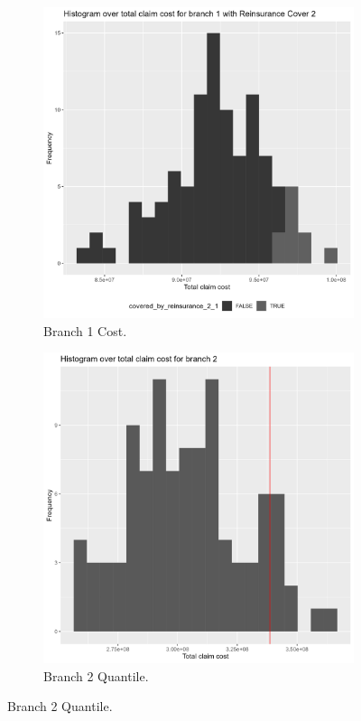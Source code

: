 \documentclass[11pt]{article}
\begin{document}
\begin{figure}[!h]
\begin{subfigure}{.24\textwidth}
      \includegraphics[width=.9\linewidth]{plots/reinsurance2/histogram_total_claim_cost_reinsurance2_1.png}
      \caption{Branch 1 Cost.}
    \end{subfigure}
    \begin{subfigure}{.24\textwidth}
      \centering
      \includegraphics[width=.9\linewidth]{plots/reinsurance2/histogram_over_90p_quantile_2.png}
      \caption{Branch 2 Quantile.}

\end{subfigure}
\end{figure}
\end{document}
